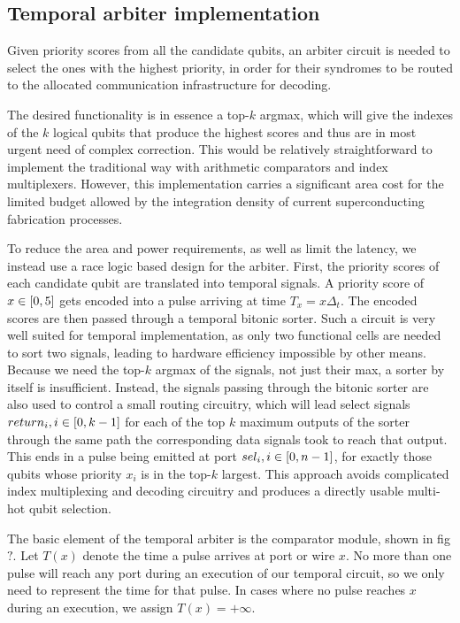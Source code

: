 \documentclass{article}
\begin{document}
\subsection{Temporal arbiter implementation}

Given priority scores from all the candidate qubits, an
arbiter circuit is needed to select the ones with the
highest priority, in order for their syndromes to be routed
to the allocated communication infrastructure for decoding.

The desired functionality is in essence a top-$k$ argmax,
which will give the indexes of the $k$ logical qubits that
produce the highest scores and thus are in most urgent need
of complex correction. This would be relatively
straightforward to implement the traditional way with
arithmetic comparators and index multiplexers. However, this
implementation carries a significant area cost for the
limited budget allowed by the integration density of current
superconducting fabrication processes.

To reduce the area and power requirements, as well as limit
the latency, we instead use a race logic based design for
the arbiter. First, the priority scores of each candidate
qubit are translated into temporal signals. A priority score
of $x \in \interval{0}{5}$ gets encoded into a pulse
arriving at time $T_x = x {\Delta}_t$. The encoded scores are
then passed through a temporal bitonic sorter. Such a
circuit is very well suited for temporal implementation, as
only two functional cells are needed to sort two signals,
leading to hardware efficiency impossible by other means.
Because we need the top-$k$ argmax of the signals, not just
their max, a sorter by itself is insufficient. Instead,
the signals passing through the bitonic sorter are also used
to control a small routing circuitry, which will lead select
signals $return_i, i \in \interval{0}{k-1}$ for each of the
top $k$ maximum outputs of the sorter through the same path
the corresponding data signals took to reach that output.
This ends in a pulse being emitted at port $sel_i, i \in
\interval{0}{n-1}$, for exactly those qubits whose priority
$x_i$ is in the top-$k$ largest. This approach avoids
complicated index multiplexing and decoding circuitry and
produces a directly usable multi-hot qubit selection.

The basic element of the temporal arbiter is the comparator
module, shown in fig$?$. Let $T(x)$ denote the time a pulse
arrives at port or wire $x$. No more than one pulse will
reach any port during an execution of our temporal circuit,
so we only need to represent the time for that pulse. In
cases where no pulse reaches $x$ during an execution, we
assign $T(x) = +\infty$.
\end{document}
